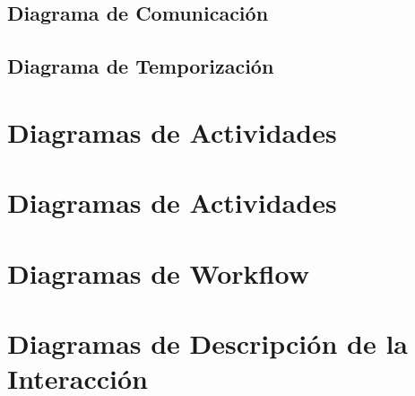 \newpage

\subsection{Diagrama de Comunicación}

\newpage

\subsection{Diagrama de Temporización}

\newpage

\section{Diagramas de Actividades}

\newpage

\section{Diagramas de Actividades}

\newpage

\section{Diagramas de Workflow}

\newpage

\section{Diagramas de Descripción de la Interacción}

\newpage